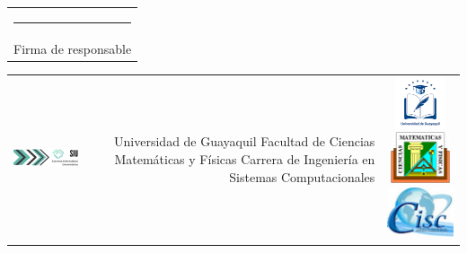 \documentclass[12pt, a4paper, nofontenc, numbers=endperiod]{apa7}
\begin{document}
{{\begin{turn}{90}
{\begin{tabular}{|p{5cm}|r|r|r|r|}
				\multicolumn{5}{c}{ \rule[0mm]{45mm}{0.1mm}}\\
				
				\multicolumn{5}{c}{ Firma de responsable} \\
				
				
			\end{tabular}
			
			
		}
		
	\end{turn}
}



\newpage

{\singlespacing \footnotesize
	\begin{turn}{90}
		\renewcommand{\multirowsetup}{\centering}	{\renewcommand{\arraystretch}{1.4}
			\begin{tabular}{|p{5cm}|r|r|r|r|} 
				
				\multicolumn{1}{p{6cm}}{ \vspace*{0.1cm}\includegraphics[width=6cm,height=1.5cm]{Imagenes/Figura36}} &\multicolumn{3}{p{9.1cm}}{\vspace{0.1mm} Universidad de Guayaquil \newline Facultad de Ciencias Matemáticas y Físicas \newline
					Carrera de Ingeniería en Sistemas Computacionales}
				& 
				\multicolumn{1}{p{4cm}}{\vspace{3mm}\includegraphics[width=2cm,height=1.5cm]{Imagenes/Figura1}\hspace*{0.5cm}\includegraphics[width=2cm,height=1.5cm]{Imagenes/Figura14}\hspace*{0.5cm}\includegraphics[width=2cm,height=1.5cm]{Imagenes/Figura15}}
				\\
				

\end{tabular}}
\end{turn}}}
\end{document}

